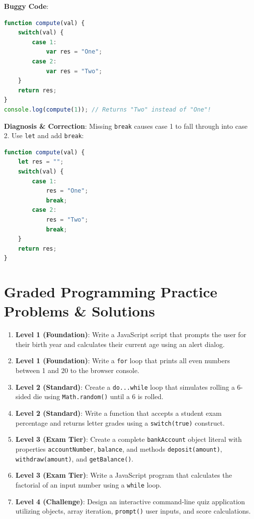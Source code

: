 \begin{debuggingbox}
\textbf{Buggy Code}:
\begin{lstlisting}[language=JavaScript]
function compute(val) {
    switch(val) {
        case 1:
            var res = "One";
        case 2:
            var res = "Two";
    }
    return res;
}
console.log(compute(1)); // Returns "Two" instead of "One"!
\end{lstlisting}
\textbf{Diagnosis \& Correction}: Missing \texttt{break} causes case 1 to fall through into case 2. Use \texttt{let} and add \texttt{break}:
\begin{lstlisting}[language=JavaScript]
function compute(val) {
    let res = "";
    switch(val) {
        case 1:
            res = "One";
            break;
        case 2:
            res = "Two";
            break;
    }
    return res;
}
\end{lstlisting}
\end{debuggingbox}

\section{Graded Programming Practice Problems \& Solutions}

\begin{practiceset}
\begin{enumerate}[leftmargin=1.5em]
    \item \textbf{Level 1 (Foundation)}: Write a JavaScript script that prompts the user for their birth year and calculates their current age using an alert dialog.
    \item \textbf{Level 1 (Foundation)}: Write a \texttt{for} loop that prints all even numbers between 1 and 20 to the browser console.
    \item \textbf{Level 2 (Standard)}: Create a \texttt{do...while} loop that simulates rolling a 6-sided die using \texttt{Math.random()} until a 6 is rolled.
    \item \textbf{Level 2 (Standard)}: Write a function that accepts a student exam percentage and returns letter grades using a \texttt{switch(true)} construct.
    \item \textbf{Level 3 (Exam Tier)}: Create a complete \texttt{bankAccount} object literal with properties \texttt{accountNumber}, \texttt{balance}, and methods \texttt{deposit(amount)}, \texttt{withdraw(amount)}, and \texttt{getBalance()}.
    \item \textbf{Level 3 (Exam Tier)}: Write a JavaScript program that calculates the factorial of an input number using a \texttt{while} loop.
    \item \textbf{Level 4 (Challenge)}: Design an interactive command-line quiz application utilizing objects, array iteration, \texttt{prompt()} user inputs, and score calculations.
\end{enumerate}
\end{practiceset}

